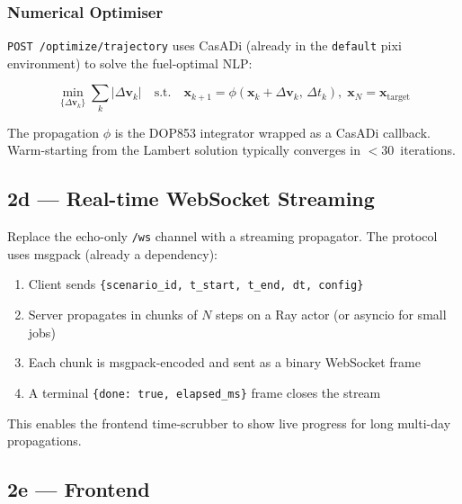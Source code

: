 \documentclass[11pt, a4paper]{article}
\begin{document}
\subsubsection{Numerical Optimiser}

\texttt{POST /optimize/trajectory} uses CasADi (already in the \texttt{default}
pixi environment) to solve the fuel-optimal NLP:

\begin{equation}
  \min_{\{\Delta \mathbf{v}_k\}} \sum_k |\Delta \mathbf{v}_k|
  \quad \text{s.t.} \quad
  \mathbf{x}_{k+1} = \phi(\mathbf{x}_k + \Delta\mathbf{v}_k,\, \Delta t_k),\;
  \mathbf{x}_N = \mathbf{x}_\text{target}
\end{equation}

The propagation $\phi$ is the DOP853 integrator wrapped as a CasADi callback.
Warm-starting from the Lambert solution typically converges in $< 30$~iterations.

\subsection{2d — Real-time WebSocket Streaming}

Replace the echo-only \texttt{/ws} channel with a streaming propagator. The
protocol uses msgpack (already a dependency):

\begin{enumerate}[noitemsep]
  \item Client sends \texttt{\{scenario\_id, t\_start, t\_end, dt, config\}}
  \item Server propagates in chunks of $N$ steps on a Ray actor (or asyncio for
        small jobs)
  \item Each chunk is msgpack-encoded and sent as a binary WebSocket frame
  \item A terminal \texttt{\{done: true, elapsed\_ms\}} frame closes the stream
\end{enumerate}

This enables the frontend time-scrubber to show live progress for long
multi-day propagations.

\subsection{2e — Frontend}
\end{document}
